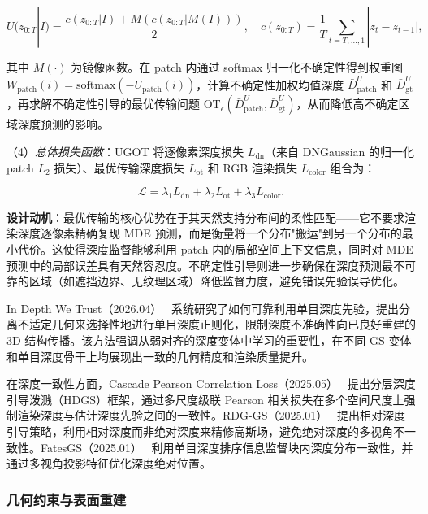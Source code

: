 \begin{equation*}
U(z_{0:T} | I) = \frac{c(z_{0:T} | I) + M(c(z_{0:T} | M(I)))}{2}, \quad c(z_{0:T}) = \frac{1}{T} \sum_{t=T,\ldots,1} |z_t - z_{t-1}|,
\end{equation*}

其中 $M(\cdot)$ 为镜像函数。在 patch 内通过 softmax 归一化不确定性得到权重图 $W_{\mathrm{patch}}(i) = \mathrm{softmax}(-U_{\mathrm{patch}}(i))$，计算不确定性加权均值深度 $\bar{D}_{\mathrm{patch}}^U$ 和 $\bar{D}_{\mathrm{gt}}^U$，再求解不确定性引导的最优传输问题 $\mathrm{OT}_\epsilon(\bar{D}_{\mathrm{patch}}^U, \bar{D}_{\mathrm{gt}}^U)$，从而降低高不确定区域深度预测的影响。

（4）\textit{总体损失函数}：UGOT 将逐像素深度损失 $L_{\mathrm{dn}}$（来自 DNGaussian 的归一化 patch $L_2$ 损失）、最优传输深度损失 $L_{\mathrm{ot}}$ 和 RGB 渲染损失 $L_{\mathrm{color}}$ 组合为：

\begin{equation*}
\mathcal{L} = \lambda_1 L_{\mathrm{dn}} + \lambda_2 L_{\mathrm{ot}} + \lambda_3 L_{\mathrm{color}}.
\end{equation*}

\textbf{设计动机}：最优传输的核心优势在于其天然支持分布间的柔性匹配——它不要求渲染深度逐像素精确复现 MDE 预测，而是衡量将一个分布"搬运"到另一个分布的最小代价。这使得深度监督能够利用 patch 内的局部空间上下文信息，同时对 MDE 预测中的局部误差具有天然容忍度。不确定性引导则进一步确保在深度预测最不可靠的区域（如遮挡边界、无纹理区域）降低监督力度，避免错误先验误导优化。

In Depth We Trust（2026.04）~\cite{2604_05715} 系统研究了如何可靠利用单目深度先验，提出分离不适定几何来选择性地进行单目深度正则化，限制深度不准确性向已良好重建的 3D 结构传播。该方法强调从弱对齐的深度变体中学习的重要性，在不同 GS 变体和单目深度骨干上均展现出一致的几何精度和渲染质量提升。

在深度一致性方面，Cascade Pearson Correlation Loss（2025.05）~\cite{2505_22279} 提出分层深度引导泼溅（HDGS）框架，通过多尺度级联 Pearson 相关损失在多个空间尺度上强制渲染深度与估计深度先验之间的一致性。RDG-GS（2025.01）~\cite{2501_11102} 提出相对深度引导策略，利用相对深度而非绝对深度来精修高斯场，避免绝对深度的多视角不一致性。FatesGS（2025.01）~\cite{2501_04628} 利用单目深度排序信息监督块内深度分布一致性，并通过多视角投影特征优化深度绝对位置。

\subsubsection{几何约束与表面重建}

